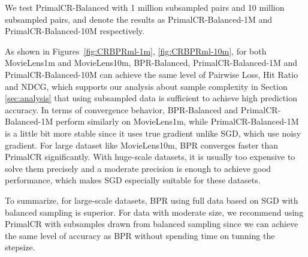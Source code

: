 \documentclass{article}
\numberwithin{equation}{section}
\newtheorem{sampling strategy}{Sampling Strategy}
\begin{document}


We test \textsf{PrimalCR-Balanced} with 1 million subsampled pairs and 10 million subsampled pairs, and denote the results as \textsf{PrimalCR-Balanced-1M} and \textsf{PrimalCR-Balanced-10M} respectively.

As shown in Figures~\ref{fig:CRBPRml-1m}, \ref{fig:CRBPRml-10m}, for both MovieLens1m and MovieLens10m, \textsf{BPR-Balanced}, \textsf{PrimalCR-Balanced-1M} and \textsf{PrimalCR-Balanced-10M} can achieve the same level of Pairwise Loss, Hit Ratio and NDCG, which supports our {analysis about sample complexity} in Section \ref{sec:analysis} that using subsampled data is sufficient to achieve high prediction accuracy. In terms of convergence behavior, \textsf{BPR-Balanced} and \textsf{PrimalCR-Balanced-1M} perform similarly  on MovieLens1m, while \textsf{PrimalCR-Balanced-1M} is a little bit more stable since it uses true gradient unlike   SGD, which use noisy gradient. For large dataset like MovieLens10m, \textsf{BPR} converges faster than \textsf{PrimalCR} significantly. With huge-scale datasets, it is usually too expensive to solve them precisely and a moderate precision is enough to achieve good performance, which makes SGD especially suitable for these datasets.

To summarize, for large-scale datasets, \textsf{BPR} using full data based on SGD with balanced sampling is superior. For data with moderate size, we recommend using \textsf{PrimalCR} with subsamples drawn from balanced sampling { since we can achieve the same level of accuracy as BPR without spending time on tunning the stepsize}.
\end{document}
